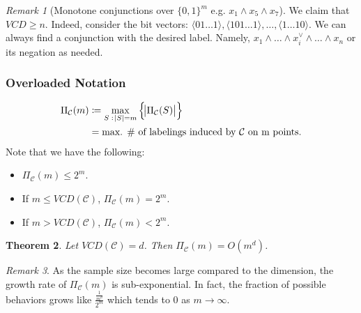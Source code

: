 \documentclass[12pt, letterpaper]{article}
\numberwithin{equation}{section} %
\newcommand{\mc}{\mathcal}
\newtheorem{theorem}{Theorem}[section]
\theoremstyle{definition}
\theoremstyle{remark}
\newtheorem{remark}[theorem]{Remark}
\begin{document}
\begin{remark}[Monotone conjunctions over $\lbrace 0,1 \rbrace^m$ e.g. $x_1\land x_5\land x_7$]
    We claim that $VCD \geq n$. Indeed, consider the bit vectors: $\langle01\ldots 1\rangle, \langle 101\ldots 1\rangle, \ldots, \langle1\ldots 10\rangle$. We can always find a conjunction with the desired label. Namely, $x_1\land\ldots \land x_i^\lor\land\ldots\land x_n$ or its negation as needed.
\end{remark}

\subsubsection*{Overloaded Notation}
\begin{align}
    \Pi_{\mc C}(m) &\coloneqq \max\limits_{S\;:\;\abs{S}= m}\left\{\abs{\Pi_{\mc C}(S)}\right\}\\
    &= \textrm{max. \# of labelings induced by $\mc C$ on m points.}
\end{align}
Note that we have the following:
\begin{itemize}
    \item  $\Pi_{\mc C}(m)\leq 2^m$.
    \item If $m\leq VCD(\mc C)$, $\Pi_{\mc C}(m)=2^m$. 
    \item If  $m > VCD(\mc C)$, $\Pi_{\mc C}(m) < 2^m$.
\end{itemize} 

\begin{theorem}\label{main thm lecture 4}
    Let $VCD(\mc C)=d$. Then $\Pi_{\mc C}(m) = O(m^d)$.
\end{theorem}

\begin{remark}
    As the sample size becomes large compared to the dimension, the growth rate of $\Pi_{\mc C}(m)$ is sub-exponential. In fact, the fraction of possible behaviors grows like $\frac{\frac1{m^d}}{2^m}$ which tends to 0 as $m\to\infty$.
\end{remark}
\end{document}
